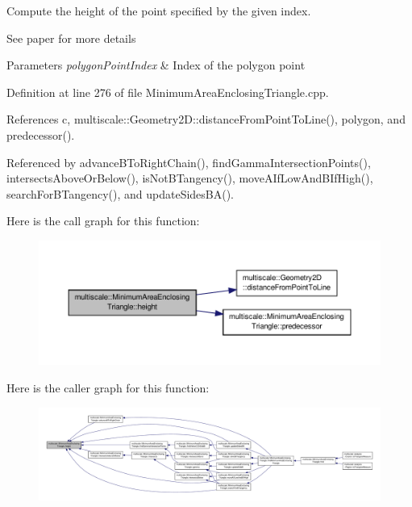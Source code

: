 Compute the height of the point specified by the given index. 

See paper for more details


\begin{DoxyParams}{Parameters}
{\em polygon\-Point\-Index} & Index of the polygon point \\
\hline
\end{DoxyParams}


Definition at line 276 of file Minimum\-Area\-Enclosing\-Triangle.\-cpp.



References c, multiscale\-::\-Geometry2\-D\-::distance\-From\-Point\-To\-Line(), polygon, and predecessor().



Referenced by advance\-B\-To\-Right\-Chain(), find\-Gamma\-Intersection\-Points(), intersects\-Above\-Or\-Below(), is\-Not\-B\-Tangency(), move\-A\-If\-Low\-And\-B\-If\-High(), search\-For\-B\-Tangency(), and update\-Sides\-B\-A().



Here is the call graph for this function\-:\nopagebreak
\begin{figure}[H]
\begin{center}
\leavevmode
\includegraphics[width=350pt]{classmultiscale_1_1MinimumAreaEnclosingTriangle_a2fb97bef9404c59d5a8ed1eff131b0ce_cgraph}
\end{center}
\end{figure}




Here is the caller graph for this function\-:\nopagebreak
\begin{figure}[H]
\begin{center}
\leavevmode
\includegraphics[width=350pt]{classmultiscale_1_1MinimumAreaEnclosingTriangle_a2fb97bef9404c59d5a8ed1eff131b0ce_icgraph}
\end{center}
\end{figure}


